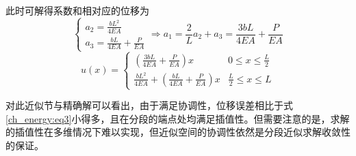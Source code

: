 此时可解得系数和相对应的位移为
\begin{equation}
\begin{cases}
a_2 = \frac{bL^2}{4EA} \\
a_3 = \frac{bL}{4EA} + \frac{P}{EA}
\end{cases} \Rightarrow
a_1 = \frac{2}{L}a_2 + a_3 = \frac{3bL}{4EA} + \frac{P}{EA}
\end{equation}
\begin{equation}
u(x) = \begin{cases}
(\frac{3bL}{4EA}+\frac{P}{EA})x & 0 \le x \le \frac{L}{2} \\
\frac{bL^2}{4EA} + (\frac{bL}{4EA}+\frac{P}{EA})x & \frac{L}{2} \le x \le L
\end{cases}
\end{equation} \par
对此近似节与精确解可以看出，由于满足协调性，位移误差相比于式\eqref{ch_energy:eq3}小得多，且在分段的端点处均满足插值性。但需要注意的是，求解的插值性在多维情况下难以实现，但近似空间的协调性依然是分段近似求解收敛性的保证。

